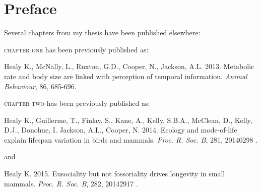 \chapter*{Preface} %

Several chapters from my thesis have been published elsewhere:

\textsc{chapter one} has been previously published as:
%
\begin{previouspaper}
  Healy K., McNally, L., Ruxton, G.D., Cooper, N., Jackson, A.L. 2013. Metabolic rate and body size are linked with perception of temporal information. \textit{Animal Behaviour}, 86, 685-696.
\end{previouspaper}


{}
\textsc{chapter two} has been previously published as:
%
\begin{previouspaper}
  Healy K., Guillerme, T., Finlay, S., Kane, A., Kelly, S.B.A., McClean, D., Kelly, D.J., Donohue, I. Jackson, A.L., Cooper, N. 2014. Ecology and mode-of-life explain lifespan variation in birds and mammals. \textit{Proc. R. Soc. B}, 281, 20140298 .
\end{previouspaper}

and 

\begin{previouspaper}
  Healy K. 2015. Eusociality but not fossoriality drives longevity in small mammals. \textit{Proc. R. Soc. B}, 282, 20142917 .
\end{previouspaper}

